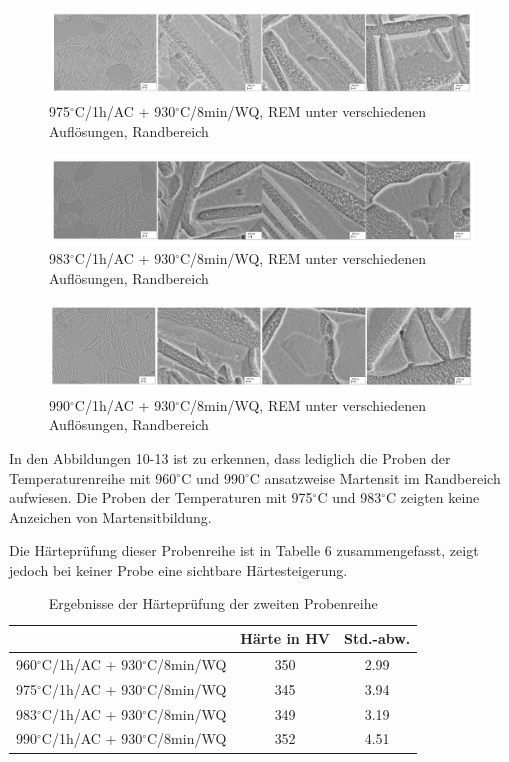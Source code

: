 \begin{figure}[!]
	\centering
	\includegraphics[width=0.9\linewidth]{"Bilder/Abbildung 11"}
	\caption[Abbildung 11]{975$^\circ$C/1h/AC + 930$^\circ$C/8min/WQ, REM unter verschiedenen Auflösungen, Randbereich}
	\label{fig:abbildung-11}
\end{figure}

\begin{figure}[!]
	\centering
	\includegraphics[width=0.9\linewidth]{"Bilder/Abbildung 12"}
	\caption[Abbildung 12]{983$^\circ$C/1h/AC + 930$^\circ$C/8min/WQ, REM unter verschiedenen Auflösungen, Randbereich}
	\label{fig:abbildung-12}
\end{figure}

\begin{figure}[!]
	\centering
	\includegraphics[width=0.9\linewidth]{"Bilder/Abbildung 13"}
	\caption[Abbildung 13]{990$^\circ$C/1h/AC + 930$^\circ$C/8min/WQ, REM unter verschiedenen Auflösungen, Randbereich}
	\label{fig:abbildung-13}
\end{figure}

In den Abbildungen 10-13 ist zu erkennen, dass lediglich die Proben der Temperaturenreihe mit 960$^\circ$C und 990$^\circ$C ansatzweise Martensit im Randbereich aufwiesen. Die Proben der Temperaturen mit 975$^\circ$C und 983$^\circ$C zeigten keine Anzeichen von Martensitbildung.

Die Härteprüfung dieser Probenreihe ist in Tabelle 6 zusammengefasst, zeigt jedoch bei keiner Probe eine sichtbare Härtesteigerung.

\begin{table}[h]
	\centering
	\begin{tabular}{|c|c|c|}
		\hline 
		& Härte in HV &  Std.-abw. \\ 
		\hline 
		960$^\circ$C/1h/AC + 930$^\circ$C/8min/WQ & 350 & 2.99 \\ 
		\hline 
		975$^\circ$C/1h/AC + 930$^\circ$C/8min/WQ & 345 & 3.94 \\ 
		\hline 
		983$^\circ$C/1h/AC + 930$^\circ$C/8min/WQ & 349 & 3.19 \\ 
		\hline 
		990$^\circ$C/1h/AC + 930$^\circ$C/8min/WQ & 352 & 4.51 \\ 
		\hline 
    \end{tabular} 
	\caption{Ergebnisse der Härteprüfung der zweiten Probenreihe}
	\label{Tabelle 6}
\end{table}


